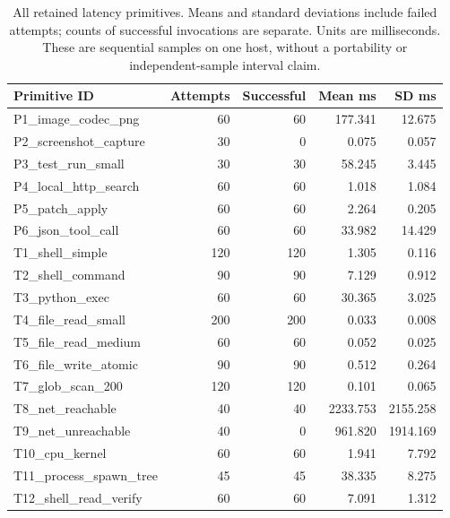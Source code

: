 \begin{table}[H]
\centering\small
\caption{All retained latency primitives. Means and standard deviations include failed attempts; counts of successful invocations are separate. Units are milliseconds. These are sequential samples on one host, without a portability or independent-sample interval claim.}
\label{tab:latency}
\begin{tabular}{lrrrr}
\toprule
Primitive ID & Attempts & Successful & Mean ms & SD ms \\
\midrule
P1\_image\_codec\_png & 60 & 60 & 177.341 & 12.675 \\
P2\_screenshot\_capture & 30 & 0 & 0.075 & 0.057 \\
P3\_test\_run\_small & 30 & 30 & 58.245 & 3.445 \\
P4\_local\_http\_search & 60 & 60 & 1.018 & 1.084 \\
P5\_patch\_apply & 60 & 60 & 2.264 & 0.205 \\
P6\_json\_tool\_call & 60 & 60 & 33.982 & 14.429 \\
T1\_shell\_simple & 120 & 120 & 1.305 & 0.116 \\
T2\_shell\_command & 90 & 90 & 7.129 & 0.912 \\
T3\_python\_exec & 60 & 60 & 30.365 & 3.025 \\
T4\_file\_read\_small & 200 & 200 & 0.033 & 0.008 \\
T5\_file\_read\_medium & 60 & 60 & 0.052 & 0.025 \\
T6\_file\_write\_atomic & 90 & 90 & 0.512 & 0.264 \\
T7\_glob\_scan\_200 & 120 & 120 & 0.101 & 0.065 \\
T8\_net\_reachable & 40 & 40 & 2233.753 & 2155.258 \\
T9\_net\_unreachable & 40 & 0 & 961.820 & 1914.169 \\
T10\_cpu\_kernel & 60 & 60 & 1.941 & 7.792 \\
T11\_process\_spawn\_tree & 45 & 45 & 38.335 & 8.275 \\
T12\_shell\_read\_verify & 60 & 60 & 7.091 & 1.312 \\
\bottomrule
\end{tabular}
\end{table}
